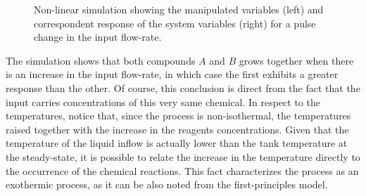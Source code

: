 \documentclass[a4paper,11pt]{book}
\numberwithin{figure}{chapter}
\numberwithin{equation}{chapter}
\numberwithin{table}{chapter}
\theoremstyle{definition}
\begin{document}
\begin{figure}[ht]

	\caption{Non-linear simulation showing the manipulated variables (left) and correspondent response of the system variables (right) for a pulse change in the input flow-rate.}
	\label{fig:dynamics01}
\end{figure}

The simulation shows that both compounds $A$ and $B$ grows together when there is an increase in the input flow-rate, in which case the first exhibits a greater response than the other. Of course, this conclusion is direct from the fact that the input carries concentrations of this very same chemical. In respect to the temperatures, notice that, since the process is non-isothermal, the temperatures raised together with the increase in the reagents concentrations. Given that the temperature of the liquid inflow is actually lower than the tank temperature at the steady-state, it is possible to relate the increase in the temperature directly to the occurrence of the chemical reactions. This fact characterizes the process as an exothermic process, as it can be also noted from the first-principles model.
\end{document}
